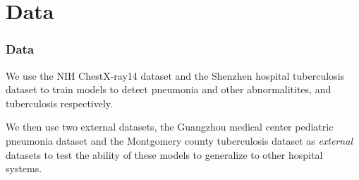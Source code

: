 \documentclass[8pt]{beamer}
\begin{document}
  \section{Data}

  \begin{frame}
\frametitle{Data}
    We use the NIH ChestX-ray14 dataset\cite{Wang2017} and the Shenzhen hospital
    tuberculosis dataset\cite{jaeger2014two} to train models to detect pneumonia
    and other abnormalitites, and tuberculosis respectively. \\ \pause

    \vspace{\baselineskip}
    
    We then use two external datasets, the Guangzhou medical center pediatric
    pneumonia dataset\cite{kermany2018identifying} and the Montgomery county
    tuberculosis dataset\cite{jaeger2014two} as \emph{external} datasets to test
    the ability of these models to generalize to other hospital systems.

  \end{frame}

\end{document}
